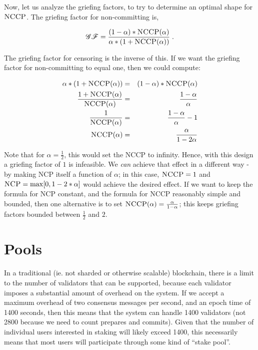 \documentclass[12pt, final]{article}
\newcommand{\NCP}{\textsc{NCP}\xspace}
\newcommand{\NCCP}{\textsc{NCCP}\xspace}
\begin{document}
Now, let us analyze the griefing factors, to try to determine an optimal shape for $\NCCP$. The griefing factor for non-committing is,

\begin{equation}
\mathscr{GF} = \frac{(1-\alpha) * \NCCP(\alpha)}{\alpha * (1 + \NCCP(\alpha))} \; .
\end{equation}

The griefing factor for censoring is the inverse of this. If we want the griefing factor for non-committing to equal one, then we could compute:

\begin{eqnarray}
\alpha * (1 + \NCCP(\alpha)) &=& (1-\alpha) * \NCCP(\alpha) \\
\frac{1 + \NCCP(\alpha)}{\NCCP(\alpha)} &=& \frac{1-\alpha}{\alpha} \\
\frac{1}{\NCCP(\alpha)} &=& \frac{1-\alpha}{\alpha} - 1 \\
\NCCP(\alpha) &=& \frac{\alpha}{1-2\alpha}
\end{eqnarray}

Note that for $\alpha = \frac{1}{2}$, this would set the \NCCP to infinity. Hence, with this design a griefing factor of $1$ is infeasible. We \emph{can} achieve that effect in a different way - by making \NCP itself a function of $\alpha$; in this case, $\NCCP = 1$ and $\NCP = \max[0, 1 - 2 * \alpha]$ would achieve the desired effect. If we want to keep the formula for \NCP constant, and the formula for \NCCP reasonably simple and bounded, then one alternative is to set $\NCCP(\alpha) = \frac{\alpha}{1-\alpha}$; this keeps griefing factors bounded between $\frac{1}{2}$ and $2$.

\section{Pools}

In a traditional (ie. not sharded or otherwise scalable) blockchain, there is a limit to the number of validators that can be supported, because each validator imposes a substantial amount of overhead on the system. If we accept a maximum overhead of two consensus messages per second, and an epoch time of 1400 seconds, then this means that the system can handle 1400 validators (not 2800 because we need to count prepares and commits). Given that the number of individual users interested in staking will likely exceed 1400, this necessarily means that most users will participate through some kind of ``stake pool''.
\end{document}
